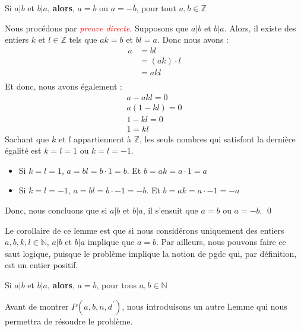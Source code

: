 \documentclass[16pt]{report}
\begin{document}
\begin{multicols*}{2}
    \begin{Lemme}{}{}
        Si $a|b$ et $b|a$, \textbf{alors}, $a = b$ ou $a = -b$, pour tout $a, b \in \mathbb{Z}$   
    \end{Lemme}                 
    \begin{Preuve*}{}{}
        Nous procédons par \textcolor{red}{\textit{preuve directe}}. Supposons que $a|b$ et $b|a$. 
        Alors, il existe des entiers $k$ et $l \in \mathbb{Z}$ tels que 
        $ak = b$ et $bl = a$. Donc nous avons : 
        \begin{align*}
            a &= bl \\
                  &= (ak) \cdot l\\
                  &= akl\\
        \end{align*}
        Et donc, nous avons également :
        \begin{align*}
            a - akl = 0 \\ 
            a(1 -kl) = 0 \\ 
            1 - kl = 0 \\ 
            1 = kl
        \end{align*}
        Sachant que $k$ et $l$ appartiennent à $\mathbb{Z}$, les seuls nombres qui satisfont la dernière égalité 
        est $k = l = 1$ ou $k = l = -1$. 
        \begin{itemize}
            \item Si  $k = l = 1$, $a = bl = b \cdot 1 = b$. Et $b = ak = a \cdot 1 = a$
            \item Si  $k = l = -1$, $a = bl = b \cdot -1 = -b$. Et $b = ak = a \cdot -1 = -a$
        \end{itemize}
        Donc, nous concluons que si $a|b$ et $b|a$, il s'ensuit que $a = b$ ou $a = -b$. \qed
    \end{Preuve*}
        Le corollaire de ce lemme est 
        que si nous considérons uniquement des entiers $a, b, k, l \in \mathbb{N}$, 
        $a|b$ et $b|a$ implique que $a = b$. Par ailleurs, nous pouvons faire 
        ce saut logique, puisque le problème implique la notion de pgdc qui, par définition, 
        est un entier positif. 
    \begin{Lemme}{}{}
        Si $a|b$ et $b|a$, \textbf{alors}, $a = b$, pour tous $a, b \in \mathbb{N}$   
    \end{Lemme}
    Avant de montrer $P(a,b,n, d^{\prime})$, nous introduisons un autre Lemme qui nous permettra de 
    résoudre le problème. 
    \begin{Lemme}{}{}

\end{Lemme}
\end{multicols*}
\end{document}
